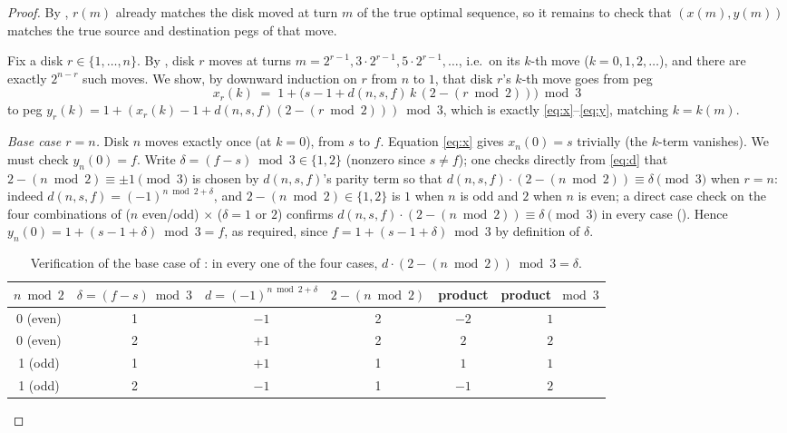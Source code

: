\documentclass[11pt]{article}
\begin{document}
\begin{proof}
By , $r(m)$ already matches the disk moved at turn $m$ of
the true optimal sequence, so it remains to check that $(x(m),y(m))$
matches the true source and destination pegs of that move.

Fix a disk $r \in \{1,\dots,n\}$. By , disk $r$ moves at
turns $m = 2^{r-1}, 3\cdot 2^{r-1}, 5 \cdot 2^{r-1}, \dots$, i.e.\ on its
$k$-th move ($k=0,1,2,\dots$), and there are exactly $2^{n-r}$ such moves.
We show, by downward induction on $r$ from $n$ to $1$, that disk $r$'s
$k$-th move goes from peg
\[
  x_r(k) \;=\; 1 + \big(s-1 + d(n,s,f)\, k \,(2 - (r \bmod 2))\big) \bmod 3
\]
to peg $y_r(k) = 1 + (x_r(k)-1+d(n,s,f)(2-(r\bmod2))) \bmod 3$, which is
exactly \eqref{eq:x}--\eqref{eq:y}, matching $k=k(m)$.

\emph{Base case $r=n$.} Disk $n$ moves exactly once (at $k=0$), from $s$ to
$f$. Equation \eqref{eq:x} gives $x_n(0) = s$ trivially (the $k$-term
vanishes). We must check $y_n(0) = f$. Write $\delta = (f-s) \bmod 3 \in
\{1,2\}$ (nonzero since $s\ne f$); one checks directly from \eqref{eq:d}
that $2 - (n \bmod 2) \equiv \pm 1 \pmod 3$ is chosen by $d(n,s,f)$'s
parity term so that $d(n,s,f)\cdot(2-(n\bmod 2)) \equiv \delta \pmod 3$ when
$r=n$: indeed $d(n,s,f) = (-1)^{n \bmod 2 + \delta}$, and
$2 - (n\bmod2) \in \{1,2\}$ is $1$ when $n$ is odd and $2$ when $n$ is even;
a direct case check on the four combinations of ($n$ even/odd)
$\times$ ($\delta = 1$ or $2$) confirms
$d(n,s,f) \cdot (2-(n\bmod 2)) \equiv \delta \pmod 3$ in every case
(). Hence $y_n(0) = 1 + (s - 1 + \delta)\bmod 3 = f$, as
required, since $f = 1 + (s-1+\delta) \bmod 3$ by definition of $\delta$.

\begin{table}[h]
\centering
\caption{Verification of the base case of : in every one
of the four cases, $d\cdot(2-(n\bmod2)) \bmod 3 = \delta$.}
\label{tab:basecase}
\begin{tabular}{cccccc}
\toprule
$n \bmod 2$ & $\delta=(f-s)\bmod 3$ & $d = (-1)^{n\bmod2+\delta}$ & $2-(n\bmod 2)$ & product & product $\bmod 3$ \\
\midrule
0 (even) & 1 & $-1$ & 2 & $-2$ & $1$ \\
0 (even) & 2 & $+1$ & 2 & $2$ & $2$ \\
1 (odd)  & 1 & $+1$ & 1 & $1$ & $1$ \\
1 (odd)  & 2 & $-1$ & 1 & $-1$ & $2$ \\
\bottomrule
\end{tabular}
\end{table}


\end{proof}
\end{document}
